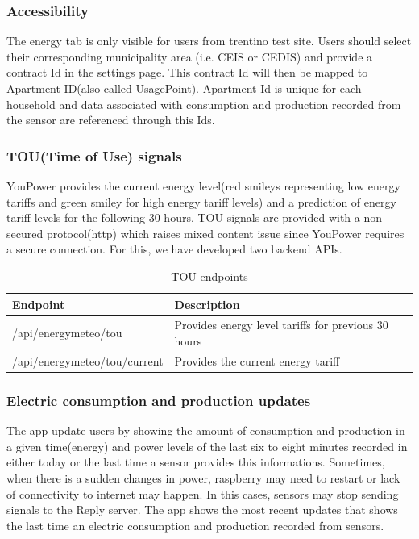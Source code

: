 \subsubsection{Accessibility}
The energy tab is only visible for users from trentino test site. Users should select their  corresponding municipality area (i.e. CEIS or CEDIS) and provide a contract Id in the settings page. This contract Id will then be mapped to Apartment ID(also called UsagePoint). Apartment Id is unique for each household and data associated with consumption and production recorded from the sensor are referenced through  this Ids.
\subsubsection{TOU(Time of Use) signals}
YouPower provides the current energy level(red smileys representing  low energy  tariffs and green smiley for high energy tariff levels) and a prediction of energy tariff levels for the following 30 hours. TOU signals are provided with a non-secured protocol(http) which raises mixed content issue since YouPower requires a secure connection. For this, we have developed two backend APIs.
\begin{table}
\caption{TOU endpoints}\label{tab:app_nav}
\begin{center} \footnotesize 
\begin{tabular}{ l p{6cm}}
\hline
\textbf{Endpoint}  &
\textbf{Description}  \\ \hline

/api/energymeteo/tou  & 
Provides energy level tariffs for previous 30 hours
\\ 
/api/energymeteo/tou/current & Provides the current energy tariff \\ 
 \hline
\end{tabular}
\end{center} 
\end{table}
\subsubsection{Electric consumption and production updates}
The app update users by showing the amount of consumption and production in a given time(energy) and power levels of the last six to eight minutes recorded in either today or the last time a sensor provides this informations. Sometimes, when there is a sudden changes in power, raspberry may need  to restart or  lack of connectivity to internet may happen. In this cases, sensors may stop sending signals to the Reply server. The app shows the most recent updates that shows the last time an electric consumption and production recorded from sensors.
